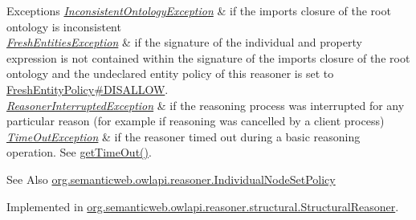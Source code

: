 \begin{DoxyExceptions}{Exceptions}
{\em \hyperlink{classorg_1_1semanticweb_1_1owlapi_1_1reasoner_1_1_inconsistent_ontology_exception}{Inconsistent\-Ontology\-Exception}} & if the imports closure of the root ontology is inconsistent \\
\hline
{\em \hyperlink{classorg_1_1semanticweb_1_1owlapi_1_1reasoner_1_1_fresh_entities_exception}{Fresh\-Entities\-Exception}} & if the signature of the individual and property expression is not contained within the signature of the imports closure of the root ontology and the undeclared entity policy of this reasoner is set to \hyperlink{enumorg_1_1semanticweb_1_1owlapi_1_1reasoner_1_1_fresh_entity_policy_a762eae6d5b2449d125311ecaabfdc8d0}{Fresh\-Entity\-Policy\#\-D\-I\-S\-A\-L\-L\-O\-W}. \\
\hline
{\em \hyperlink{classorg_1_1semanticweb_1_1owlapi_1_1reasoner_1_1_reasoner_interrupted_exception}{Reasoner\-Interrupted\-Exception}} & if the reasoning process was interrupted for any particular reason (for example if reasoning was cancelled by a client process) \\
\hline
{\em \hyperlink{classorg_1_1semanticweb_1_1owlapi_1_1reasoner_1_1_time_out_exception}{Time\-Out\-Exception}} & if the reasoner timed out during a basic reasoning operation. See \hyperlink{interfaceorg_1_1semanticweb_1_1owlapi_1_1reasoner_1_1_o_w_l_reasoner_a44b2c968f989afe5290db29c90faa164}{get\-Time\-Out()}. \\
\hline
\end{DoxyExceptions}
\begin{DoxySeeAlso}{See Also}
\hyperlink{enumorg_1_1semanticweb_1_1owlapi_1_1reasoner_1_1_individual_node_set_policy}{org.\-semanticweb.\-owlapi.\-reasoner.\-Individual\-Node\-Set\-Policy} 
\end{DoxySeeAlso}


Implemented in \hyperlink{classorg_1_1semanticweb_1_1owlapi_1_1reasoner_1_1structural_1_1_structural_reasoner_a6d4be33b72e5d624d8a930b456d6d31f}{org.\-semanticweb.\-owlapi.\-reasoner.\-structural.\-Structural\-Reasoner}.

